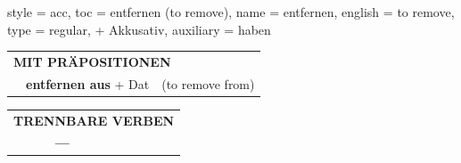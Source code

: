 \begin{verbentry}{
  style = {acc},
  toc = {entfernen (to remove)},
  name = {entfernen},
  english = {to remove},
  type = {regular, + Akkusativ},
  auxiliary = {haben}
}
\vspace{10pt}

\begin{tabular}{lll}
\multicolumn{3}{l}{\textbf{MIT PRÄPOSITIONEN}}\\
& \textbf{entfernen aus} + Dat & (to remove from)\\
\end{tabular}
\hfill
\begin{tabular}{lll}
\multicolumn{3}{l}{\textbf{TRENNBARE VERBEN}}\\
& \textbf{---} & \\
\end{tabular}

\vspace{-5pt}
\end{verbentry}

